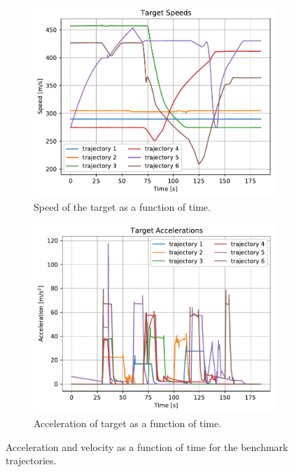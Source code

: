\documentclass[english, 12pt, a4paper, elec, utf8, a-1b, online]{aaltothesis}
\begin{document}
\begin{figure}
    \centering
    \begin{subfigure}{0.8\textwidth}
        \includegraphics[width=\linewidth]{figures/benchmark/velocities.pdf}
        \caption{Speed of the target as a function of time.}
        \label{fig:benchmark_velocities}
    \end{subfigure}
    \hfill
    \begin{subfigure}{0.8\textwidth}
        \includegraphics[width=\linewidth]{figures/benchmark/accelerations.pdf}
        \caption{Acceleration of target as a function of time.}
        \label{fig:benchmark_acceleration}
    \end{subfigure}
    \label{fig:benchmark_vel_acc}
    \caption{Acceleration and velocity as a function of time for the benchmark trajectories. }
\end{figure}
\end{document}
